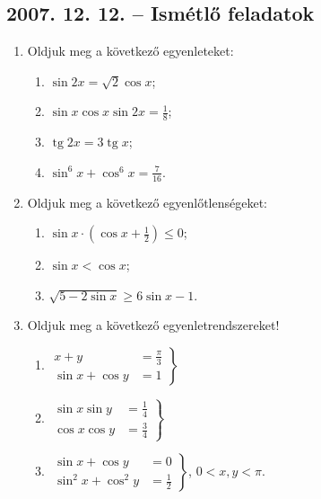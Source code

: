\documentclass{article}
\newenvironment{abc}{\begin{enumerate}[label=\textit{\alph*})]}{\end{enumerate}}
\newcommand{\tg}{\mathop{\mathrm{tg}}\nolimits}
\begin{document}
\subsection*{2007. 12. 12. -- Ismétlő feladatok}
\begin{enumerate}
\item Oldjuk meg a következő egyenleteket:
\begin{abc}
\item $\sin 2x=\sqrt{2}\cos x$;
\item $\sin x\cos x\sin 2x=\frac{1}{8}$;
\item $\tg 2x=3\tg x$;
\item $\sin^6x+\cos^6x=\frac{7}{16}$.
\end{abc}
\item Oldjuk meg a következő egyenlőtlenségeket:
\begin{abc}
\item $\displaystyle{\sin x\cdot\left(\cos x+\frac{1}{2}\right)\le 0}$;
\item $\sin x < \cos x$;
\item $\sqrt{5-2\sin x}\ge 6\sin x-1$.
\end{abc}
\item Oldjuk meg a következő egyenletrendszereket!
\begin{abc}
\item $\left.
\begin{aligned}
x+y&=\frac{\pi}{3}\\
\sin x+\cos y&=1
\end{aligned}
\right\}$
\item $\left.
\begin{aligned}
\sin x\sin y&=\frac{1}{4}\\
\cos x\cos y&=\frac{3}{4}
\end{aligned}
\right\}$
\item $\left.
\begin{aligned}
\sin x+\cos y&=0\\
\sin^2x+\cos^2y&=\frac{1}{2}
\end{aligned}
\right\}$, $0<x, y<\pi$.
\end{abc}
\end{enumerate}
\end{document}
